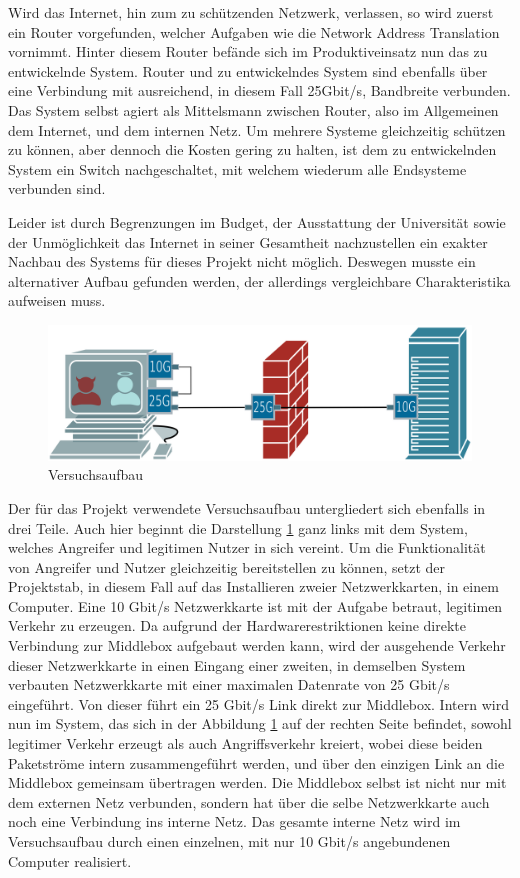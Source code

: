 \documentclass[../review_3.tex]{subfiles}
\begin{document}
Wird das Internet, hin zum zu schützenden Netzwerk, verlassen, so wird zuerst ein Router vorgefunden, welcher Aufgaben wie die Network Address Translation vornimmt. Hinter diesem Router befände sich im Produktiveinsatz nun das zu entwickelnde System. Router und zu entwickelndes System sind ebenfalls über eine Verbindung mit ausreichend, in diesem Fall 25Gbit/s, Bandbreite verbunden. Das System selbst agiert als Mittelsmann zwischen Router, also im Allgemeinen dem Internet, und dem internen Netz. Um mehrere Systeme gleichzeitig schützen zu können, aber dennoch die Kosten gering zu halten, ist dem zu entwickelnden System ein Switch nachgeschaltet, mit welchem wiederum alle Endsysteme verbunden sind.

Leider ist durch Begrenzungen im Budget, der Ausstattung der Universität sowie der Unmöglichkeit das Internet in seiner Gesamtheit nachzustellen ein exakter Nachbau des Systems für dieses Projekt nicht möglich. Deswegen musste ein alternativer Aufbau gefunden werden, der allerdings vergleichbare Charakteristika aufweisen muss.

\begin{figure}[h]
    \centering
    \includegraphics[width=0.7\linewidth]{img/Netwerkplan-Versuch}
    \caption{Versuchsaufbau}
    \label{fig:Versuchsaufbau}
\end{figure}

Der für das Projekt verwendete Versuchsaufbau untergliedert sich ebenfalls in drei Teile. Auch hier beginnt die Darstellung \ref{fig:Versuchsaufbau} ganz links mit dem System, welches Angreifer und legitimen Nutzer in sich vereint. Um die Funktionalität von Angreifer und Nutzer gleichzeitig bereitstellen zu können, setzt der Projektstab, in diesem Fall auf das Installieren zweier Netzwerkkarten, in einem Computer. Eine 10 Gbit/s Netzwerkkarte ist mit der Aufgabe betraut, legitimen Verkehr zu erzeugen. Da aufgrund der Hardwarerestriktionen keine direkte Verbindung zur Middlebox aufgebaut werden kann, wird der ausgehende Verkehr dieser Netzwerkkarte in einen Eingang einer zweiten, in demselben System verbauten Netzwerkkarte mit einer maximalen Datenrate von 25 Gbit/s eingeführt. Von dieser führt ein 25 Gbit/s Link direkt zur Middlebox. Intern wird nun im System, das sich in der Abbildung \ref{fig:Versuchsaufbau} auf der rechten Seite befindet, sowohl legitimer Verkehr erzeugt als auch Angriffsverkehr kreiert, wobei diese beiden Paketströme intern zusammengeführt werden, und über den einzigen Link an die Middlebox gemeinsam übertragen werden. Die Middlebox selbst ist nicht nur mit dem externen Netz verbunden, sondern hat über die selbe Netzwerkkarte auch noch eine Verbindung ins interne Netz. Das gesamte interne Netz wird im Versuchsaufbau durch einen einzelnen, mit nur 10 Gbit/s angebundenen Computer realisiert.
\end{document}
